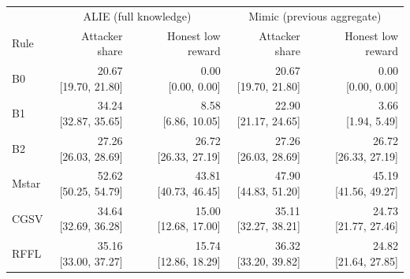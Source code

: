 \begin{tabular}{lrrrr}
\toprule
& \multicolumn{2}{c}{ALIE (full knowledge)} & \multicolumn{2}{c}{Mimic (previous aggregate)} \\
\cmidrule(lr){2-3}\cmidrule(lr){4-5}
Rule & Attacker share & Honest low reward & Attacker share & Honest low reward \\
\midrule
B0 & \shortstack{20.67\\{}[19.70, 21.80]} & \shortstack{0.00\\{}[0.00, 0.00]} & \shortstack{20.67\\{}[19.70, 21.80]} & \shortstack{0.00\\{}[0.00, 0.00]} \\
B1 & \shortstack{34.24\\{}[32.87, 35.65]} & \shortstack{8.58\\{}[6.86, 10.05]} & \shortstack{22.90\\{}[21.17, 24.65]} & \shortstack{3.66\\{}[1.94, 5.49]} \\
B2 & \shortstack{27.26\\{}[26.03, 28.69]} & \shortstack{26.72\\{}[26.33, 27.19]} & \shortstack{27.26\\{}[26.03, 28.69]} & \shortstack{26.72\\{}[26.33, 27.19]} \\
Mstar & \shortstack{52.62\\{}[50.25, 54.79]} & \shortstack{43.81\\{}[40.73, 46.45]} & \shortstack{47.90\\{}[44.83, 51.20]} & \shortstack{45.19\\{}[41.56, 49.27]} \\
CGSV & \shortstack{34.64\\{}[32.69, 36.28]} & \shortstack{15.00\\{}[12.68, 17.00]} & \shortstack{35.11\\{}[32.27, 38.21]} & \shortstack{24.73\\{}[21.77, 27.46]} \\
RFFL & \shortstack{35.16\\{}[33.00, 37.27]} & \shortstack{15.74\\{}[12.86, 18.29]} & \shortstack{36.32\\{}[33.20, 39.82]} & \shortstack{24.82\\{}[21.64, 27.85]} \\
\bottomrule
\end{tabular}
